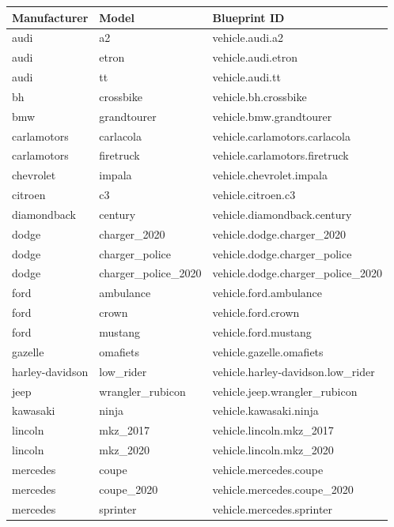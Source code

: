 \begin{table}[h!]
\centering
\begin{tabular}{|l|l|l|}
\hline
Manufacturer & Model & Blueprint ID \\
\hline
audi & a2 & vehicle.audi.a2 \\
\hline
audi & etron & vehicle.audi.etron \\
\hline
audi & tt & vehicle.audi.tt \\
\hline
bh & crossbike & vehicle.bh.crossbike \\
\hline
bmw & grandtourer & vehicle.bmw.grandtourer \\
\hline
carlamotors & carlacola & vehicle.carlamotors.carlacola \\
\hline
carlamotors & firetruck & vehicle.carlamotors.firetruck \\
\hline
chevrolet & impala & vehicle.chevrolet.impala \\
\hline
citroen & c3 & vehicle.citroen.c3 \\
\hline
diamondback & century & vehicle.diamondback.century \\
\hline
dodge & charger\_2020 & vehicle.dodge.charger\_2020 \\
\hline
dodge & charger\_police & vehicle.dodge.charger\_police \\
\hline
dodge & charger\_police\_2020 & vehicle.dodge.charger\_police\_2020 \\
\hline
ford & ambulance & vehicle.ford.ambulance \\
\hline
ford & crown & vehicle.ford.crown \\
\hline
ford & mustang & vehicle.ford.mustang \\
\hline
gazelle & omafiets & vehicle.gazelle.omafiets \\
\hline
harley-davidson & low\_rider & vehicle.harley-davidson.low\_rider \\
\hline
jeep & wrangler\_rubicon & vehicle.jeep.wrangler\_rubicon \\
\hline
kawasaki & ninja & vehicle.kawasaki.ninja \\
\hline
lincoln & mkz\_2017 & vehicle.lincoln.mkz\_2017 \\
\hline
lincoln & mkz\_2020 & vehicle.lincoln.mkz\_2020 \\
\hline
mercedes & coupe & vehicle.mercedes.coupe \\
\hline
mercedes & coupe\_2020 & vehicle.mercedes.coupe\_2020 \\
\hline
mercedes & sprinter & vehicle.mercedes.sprinter \\

\end{tabular}
\end{table}
